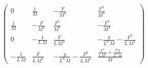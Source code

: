 \begin{equation}
\left(\begin{array}{cccc} 0 & \frac{1}{M} & -\frac{F}{M^2} & \frac{F^2}{M^3}\\ \frac{1}{M} & -\frac{F}{M^2} & \frac{F^2}{M^3} & -\frac{F^3}{M^4}\\ 0 & -\frac{1}{L\,M} & \frac{F}{L\,M^2} & -\frac{g}{L^2\,M}-\frac{F^2}{L\,M^3}\\ -\frac{1}{L\,M} & \frac{F}{L\,M^2} & -\frac{g}{L^2\,M}-\frac{F^2}{L\,M^3} & \frac{\frac{F^3}{L\,M^3}+\frac{F\,g}{L^2\,M}}{M} \end{array}\right)
\end{equation}
